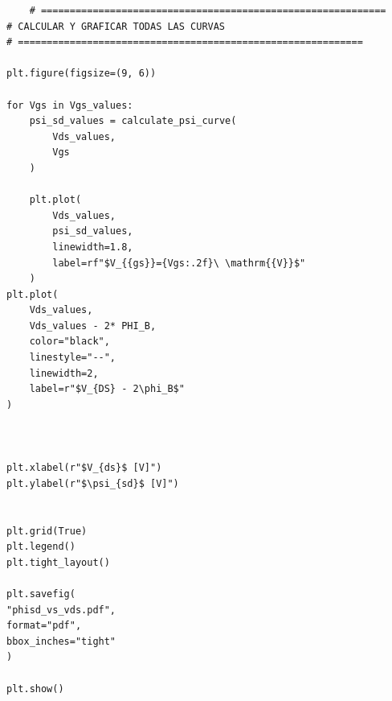 \documentclass[a4paper, twoside, 10pt, spanish]{article}
\numberwithin{table}{section}
\begin{document}
\begin{verbatim}
    # ============================================================
# CALCULAR Y GRAFICAR TODAS LAS CURVAS
# ============================================================

plt.figure(figsize=(9, 6))

for Vgs in Vgs_values:
    psi_sd_values = calculate_psi_curve(
        Vds_values,
        Vgs
    )

    plt.plot(
        Vds_values,
        psi_sd_values,
        linewidth=1.8,
        label=rf"$V_{{gs}}={Vgs:.2f}\ \mathrm{{V}}$"
    )
plt.plot(
    Vds_values,
    Vds_values - 2* PHI_B,
    color="black",
    linestyle="--",
    linewidth=2,
    label=r"$V_{DS} - 2\phi_B$"
)



plt.xlabel(r"$V_{ds}$ [V]")
plt.ylabel(r"$\psi_{sd}$ [V]")


plt.grid(True)
plt.legend()
plt.tight_layout()

plt.savefig(
"phisd_vs_vds.pdf",
format="pdf",
bbox_inches="tight"
)

plt.show()
\end{verbatim}
\end{document}
